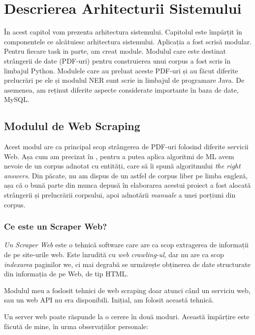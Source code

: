\chapter{Descrierea Arhitecturii Sistemului}
\label{chapter:architecture}

În acest capitol vom prezenta arhitectura sistemului. Capitolul este împărțit în componentele ce alcătuiesc arhitectura sistemului. Aplicația a fost scrisă modular. Pentru fiecare task in parte, am creat module. Modulul care este destinat strângerii de date (PDF-uri) pentru construierea unui corpus a fost scris în limbajul Python. Modulele care au preluat aceste PDF-uri și au făcut diferite prelucrări pe ele și modulul NER sunt scrie in limbajul de programare Java. De asemenea, am reținut diferite aspecte considerate importante în baza de date, MySQL.


\section{Modulul de Web Scraping}
\label{sec:web-module}

Acest modul are ca principal scop strângerea de PDF-uri folosind diferite servicii Web. Așa cum am precizat în , pentru a putea aplica algoritmi de ML avem nevoie de un corpus adnotat cu entități, care să îi spună algoritmului \textit{the right answers}. Din păcate, nu am dispus de un astfel de corpus liber pe limba engleză, așa că o bună parte din munca depusă în elaborarea acestui proiect a fost alocată strângerii și prelucrării corpsului, apoi adnotării \textit{manuale} a unei porțiuni din corpus.


\subsection{Ce este un Scraper Web?}

\textit{Un Scraper Web} este o tehnică software care are ca scop extragerea de informații de pe site-urile web. Este înrudită cu \textit{web crawling-ul}, dar nu are ca scop \textit{indexarea} paginilor we, ci mai degrabă se urmărește obținerea de date structurate din informația de pe Web, de tip HTML.

Modulul meu a foslosit tehnici de web scraping doar atunci când un serviciu web, sau un web API nu era disponibili. Inițial, am folosit această tehnică.

Un server web poate răspunde la o cerere în două moduri. Această împărțire este făcută de mine, în urma observațiilor personale:

